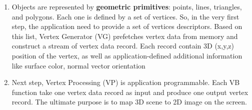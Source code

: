   \begin{enumerate}
  \item Objects are represented by {\bf geometric primitives}: points,
    lines, triangles, and polygons. Each one is defined by a set of
    vertices. So, in the very first step, the application need to
    provide a set of vertices descriptors. Based on this list, Vertex
    Generator (VG) prefetches vertex data from memory and construct a
    stream of vertex data record. Each record contain 3D (x,y,z)
    position of the vertex, as well as application-defined additional
    information like surface color, normal vector orientation

  \item Next step, Vertex Processing (VP) is application
    programmable. Each VB function take one vertex data record as input
    and produce one output vertex record. The ultimate purpose is to map
    3D scene to 2D image on the screen.

  \end{enumerate}

